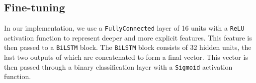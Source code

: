 \subsection{Fine-tuning}


In our implementation, we use a \verb|FullyConnected| layer of 16 units with a \verb|ReLU| activation function to represent deeper and more explicit features. This feature is then passed to a \verb|BiLSTM| block. The \verb|BiLSTM| block consists of 32 hidden units, the last two outputs of which are concatenated to form a final vector. This vector is then passed through a binary classification layer with a \verb|Sigmoid| activation function.


